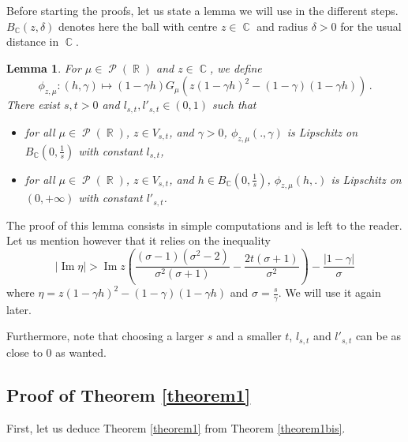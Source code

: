 \documentclass[11pt,a4paper]{article}
\DeclareMathOperator{\R}{\mathbb{R}}
\DeclareMathOperator{\C}{\mathbb{C}}
\DeclareMathOperator{\PP}{\mathcal{P}}
\DeclareMathOperator{\1}{\mathbf{1}}
\DeclareMathOperator{\Imag}{\mathrm{Im}}
\newtheorem{Lemma}[Proposition]{Lemma}
\theoremstyle{definition}
\begin{document}
Before starting the proofs, let us state a lemma we will use in the different steps. $B_{\C}(z,\delta)$ denotes here the ball with centre $z \in \C$ and radius $\delta>0$ for the usual distance in $\C$.

\begin{Lemma} \label{freeness_lemma}
For $\mu \in \PP(\R)$ and $z \in \C$, we define
\begin{displaymath}
\phi_{z,\mu} : (h,\gamma) \mapsto (1-\gamma h) G_{\mu}(z(1-\gamma h)^2-(1-\gamma)(1-\gamma h)) \, .
\end{displaymath}
There exist $s,t>0$ and $l_{s,t}, l'_{s,t} \in (0,1)$ such that
\begin{itemize}
\item for all $\mu \in \PP(\R)$, $z \in V_{s,t}$, and $\gamma>0$, $\phi_{z,\mu}(.,\gamma)$ is Lipschitz on $B_{\C} \left( 0,\frac1s \right)$ with constant $l_{s,t}$,
\item for all $\mu \in \PP(\R)$, $z \in V_{s,t}$, and $h \in B_{\C} \left( 0,\frac1s \right)$, $\phi_{z,\mu}(h,.)$ is Lipschitz on $(0,+\infty)$ with constant $l'_{s,t}$.
\end{itemize}
\end{Lemma}

The proof of this lemma consists in simple computations and is left to the reader. Let us mention however that it relies on the inequality
\begin{equation} \label{ImEta}
|\Imag \eta| > \Imag z \left( \frac{(\sigma-1)(\sigma^2-2)}{\sigma^2(\sigma+1)} - \frac{2t(\sigma+1)}{\sigma^2} \right) - \frac{|1-\gamma|}{\sigma}
\end{equation}
where $\eta = z(1-\gamma h)^2-(1-\gamma)(1-\gamma h)$ and $\sigma = \frac{s}{\gamma}$. We will use it again later.

Furthermore, note that choosing a larger $s$ and a smaller $t$, $l_{s,t}$ and $l'_{s,t}$ can be as close to 0 as wanted.




\subsection{Proof of Theorem \ref{theorem1}} \label{section_1bis->1}

First, let us deduce Theorem \ref{theorem1} from Theorem \ref{theorem1bis}.
\end{document}
